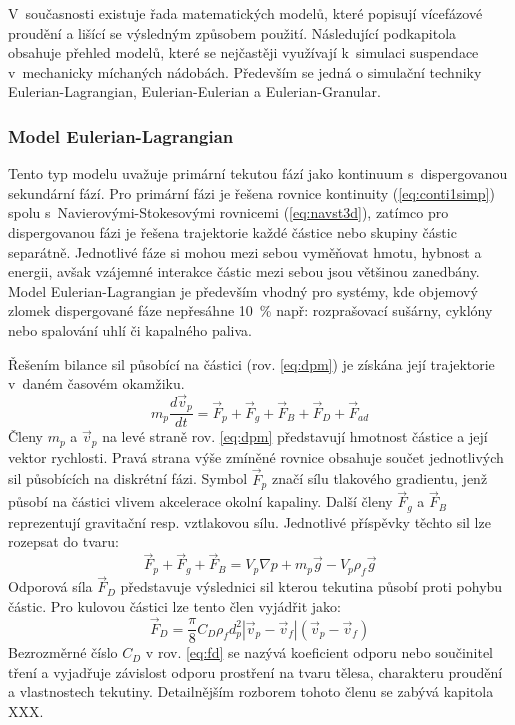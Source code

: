 V~současnosti existuje řada matematických modelů, které popisují vícefázové proudění a lišící se výsledným způsobem použití. Následující podkapitola obsahuje přehled modelů, které se nejčastěji využívají k~simulaci suspendace v~mechanicky míchaných nádobách. Především se jedná o simulační techniky Eulerian-Lagrangian, Eulerian-Eulerian a Eulerian-Granular.

\subsubsection{Model Eulerian-Lagrangian}
Tento typ modelu uvažuje primární tekutou fází jako kontinuum s~dispergovanou sekundární fází. Pro primární fázi je řešena rovnice kontinuity (\ref{eq:conti1simp}) spolu s~Navierovými-Stokesovými rovnicemi (\ref{eq:navst3d}), zatímco pro dispergovanou fázi je řešena trajektorie každé částice nebo skupiny částic separátně. Jednotlivé fáze si mohou mezi sebou vyměňovat hmotu, hybnost a energii, avšak vzájemné interakce částic mezi sebou jsou většinou zanedbány. Model Eulerian-Lagrangian je především vhodný pro systémy, kde objemový zlomek dispergované fáze nepřesáhne \SI{10}{\percent} např: rozprašovací sušárny, cyklóny nebo spalování uhlí či kapalného paliva. 

Řešením bilance sil působící na částici (rov. \ref{eq:dpm}) je získána její trajektorie v~daném časovém okamžiku.
\begin{equation}
	m_{p}\frac{d\vec{v}_{p}}{dt} = \vec{F}_{p} + \vec{F}_{g} + \vec{F}_{B} + \vec{F}_{D} + \vec{F}_{ad}
	\label{eq:dpm}
\end{equation} 
Členy $m_{p}$ a $\vec{v}_{p}$ na levé straně rov. \ref{eq:dpm} představují hmotnost částice a její vektor rychlosti. Pravá strana výše zmíněné rovnice obsahuje součet jednotlivých sil působících na diskrétní fázi. Symbol $\vec{F}_{p}$ značí sílu tlakového gradientu, jenž působí na částici vlivem akcelerace okolní kapaliny. Další členy $\vec{F}_{g}$ a $\vec{F}_{B}$ reprezentují gravitační resp. vztlakovou sílu. Jednotlivé příspěvky těchto sil lze rozepsat do tvaru:    
\begin{equation}
	\vec{F}_{p} + \vec{F}_{g} + \vec{F}_{B} = V_{p} \nabla p + m_{p} \vec{g} -  V_{p} \rho_{f} \vec{g}
	\label{eq:force3}
\end{equation} 
 Odporová síla $\vec{F}_{D}$ představuje výslednici sil kterou tekutina působí proti pohybu částic. Pro kulovou částici lze tento člen vyjádřit jako:
\begin{equation}
	\vec{F}_{D} = \frac{\pi}{8}C_{D}\rho_{f} d_{p}^{2} \left|\vec{v}_{p} - \vec{v}_{f}\right| \left(\vec{v}_{p} - \vec{v}_{f}\right)
	\label{eq:fd}
\end{equation} 
Bezrozměrné číslo $C_{D}$ v rov. \ref{eq:fd} se nazývá koeficient odporu nebo součinitel tření a vyjadřuje závislost odporu prostření na tvaru tělesa, charakteru proudění a vlastnostech tekutiny. Detailnějším rozborem tohoto členu se zabývá kapitola XXX.

